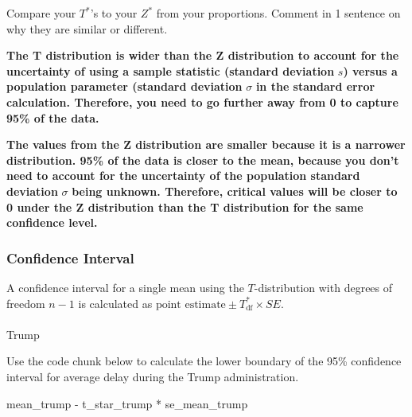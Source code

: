 \documentclass[
  letterpaper,
  DIV=11,
  numbers=noendperiod]{scrartcl}
\makeatletter
\let\oldparagraph\paragraph
\renewcommand{\paragraph}{
    \@ifstar
      \xxxParagraphStar
      \xxxParagraphNoStar
  }
\newcommand{\xxxParagraphStar}[1]{\oldparagraph*{#1}\mbox{}}
\newcommand{\xxxParagraphNoStar}[1]{\oldparagraph{#1}\mbox{}}
\newenvironment{Shaded}{\begin{snugshade}}{\end{snugshade}}
\newcommand{\NormalTok}[1]{\textcolor[rgb]{0.00,0.23,0.31}{#1}}
\newcommand{\SpecialCharTok}[1]{\textcolor[rgb]{0.37,0.37,0.37}{#1}}
\makeatother
\begin{document}
Compare your \(T^*\)'s to your \(Z^*\) from your proportions. Comment in
1 sentence on why they are similar or different.

\begin{tcolorbox}[enhanced jigsaw, colback=white, breakable, arc=.35mm, left=2mm, colframe=quarto-callout-warning-color-frame, opacityback=0, rightrule=.15mm, toprule=.15mm, bottomrule=.15mm, leftrule=.75mm]

\textbf{The T distribution is wider than the Z distribution to account
for the uncertainty of using a sample statistic (standard deviation}
\(s\)\textbf{) versus a population parameter (standard deviation}
\(\sigma\) \textbf{in the standard error calculation. Therefore, you
need to go further away from 0 to capture 95\% of the data.}

\textbf{The values from the Z distribution are smaller because it is a
narrower distribution. 95\% of the data is closer to the mean, because
you don't need to account for the uncertainty of the population standard
deviation} \(\sigma\) \textbf{being unknown. Therefore, critical values
will be closer to 0 under the Z distribution than the T distribution for
the same confidence level.}

\end{tcolorbox}

\subsubsection{Confidence Interval}\label{confidence-interval-2}

A confidence interval for a single mean using the \(T\)-distribution
with degrees of freedom \(n-1\) is calculated as
\(\text{point estimate} \pm T^*_{\text{df}} \times SE\).

\paragraph{Trump}\label{trump-1}

Use the code chunk below to calculate the lower boundary of the 95\%
confidence interval for average delay during the Trump administration.

\begin{Shaded}
\begin{Highlighting}[]
\NormalTok{mean\_trump }\SpecialCharTok{{-}}\NormalTok{ t\_star\_trump }\SpecialCharTok{*}\NormalTok{ se\_mean\_trump}
\end{Highlighting}
\end{Shaded}
\end{document}
